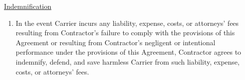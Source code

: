\underline{Indemnification}
\begin{enumerate}[
    ref = \SecondLevelEnumerator
]
    \item In the event Carrier incurs any liability, expense, costs, or
    attorneys' fees resulting from Contractor's failure to comply with the
    provisions of this Agreement or resulting from Contractor's negligent
    or intentional performance under the provisions of this Agreement,
    Contractor agrees to indemnify, defend, and save harmless Carrier from
    such liability, expense, costs, or attorneys' fees.
\end{enumerate}